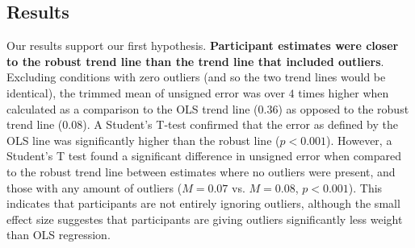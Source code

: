 \documentclass{sigchi}
\begin{document}
\subsection{Results}

Our results support our first hypothesis. \textbf{Participant estimates were closer to the robust trend line than the trend line that included outliers}. Excluding conditions with zero outliers (and so the two trend lines would be identical), the trimmed mean of unsigned error was over $4$ times higher when calculated as a comparison to the OLS trend line ($0.36$) as opposed to the robust trend line ($0.08$). A Student's T-test confirmed that the error as defined by the OLS line was significantly higher than the robust line ($p<0.001$). However, a Student's T test found a significant difference in unsigned error when compared to the robust trend line between estimates where no outliers were present, and those with any amount of outliers ($M=0.07$ vs. $M=0.08$, $p<0.001$). This indicates that participants are not entirely ignoring outliers, although the small effect size suggestes that participants are giving outliers significantly less weight than OLS regression.


\end{document}
